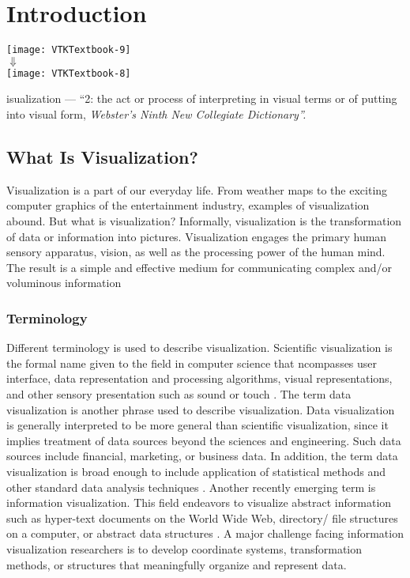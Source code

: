 \chapter[Introduction]{Introduction}
\label{chap:introduction}

\vspace{-5\baselineskip} %
\hfill
 \begin{minipage}{0.5\textwidth}
 \centering
 \texttt{[image: VTKTextbook-9]}\\
 $\mathbf{\Downarrow}$\\
 \texttt{[image: VTKTextbook-8]}\\
 \end{minipage}
\vspace{2\baselineskip}

isualization — ``2: the act or process of interpreting in
visual terms or of putting into visual form, \emph{Webster’s Ninth New Collegiate Dictionary''.}

\section{What Is Visualization?}
Visualization is a part of our everyday life. From weather maps to the exciting computer graphics of the entertainment industry, examples of visualization abound.
But what is visualization? Informally, visualization is the transformation of data or information into pictures.
Visualization engages the primary human sensory apparatus, vision, as well as the processing power of the human mind.
The result is a simple and effective medium for communicating complex and/or voluminous information

\subsection{Terminology}
Different terminology is used to describe visualization. Scientific visualization is the formal name given to the field in computer science that  ncompasses user interface, data representation and processing algorithms, visual representations, and other sensory presentation such as sound or touch \cite{McCormick87}.
The term data visualization is another phrase used to describe visualization. Data visualization is generally interpreted to be more general than scientific visualization, since it implies treatment of data sources beyond the sciences and engineering. Such data sources include financial, marketing, or business data. In addition, the term data visualization is broad enough to include application of statistical methods and other standard data analysis techniques \cite{Rosenblum94}.
Another recently emerging term is information visualization. 
This field endeavors to visualize abstract information such as hyper-text documents on the World Wide Web, directory/ file structures on a computer, or abstract data structures \cite{InfoVis95}.
A major challenge facing information visualization researchers is to develop coordinate systems, transformation methods, or structures that meaningfully organize and represent data.

